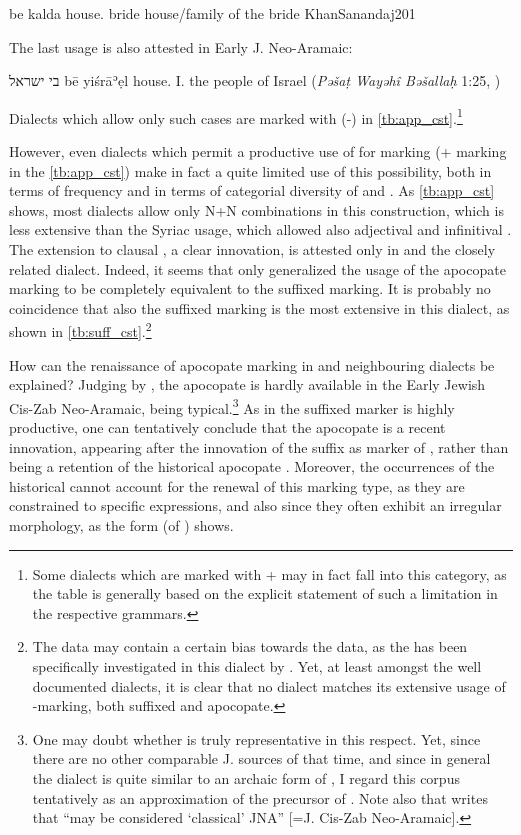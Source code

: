 {be\cb{} kalda}
{house.\cst\cb{} bride}
{house/family of the bride}
{KhanSanandaj}{201}\antipar

The last usage is also attested  in Early J. Neo-Aramaic:

{בי ישראל}
{bē yiśrāʾẹl}
{house.\cst{} I.}
{the people of Israel}
{(\textit{Pəšaṭ Wayəhî Bəšallaḥ} 1:25, \cite[38; see there  fn.\ 16]{SabarNerwa})}


Dialects which allow only such cases are marked with (-) in \ref{tb:app_cst}.\footnote{Some dialects which are marked with + may in fact fall into this category, as the table is generally based on the explicit statement of such a limitation in the respective grammars.}

However, even dialects which permit a productive use of  for marking \cst* \prims (+ marking in the \ref{tb:app_cst}) make in fact a quite limited use of this possibility, both in terms of frequency and in terms of categorial diversity of \prim and \secn. As  \ref{tb:app_cst} shows, most dialects allow only N+N combinations in this construction, which is less extensive than the Syriac usage, which allowed also adjectival and infinitival \prims. The extension to clausal \secns, a clear innovation, is attested only in \JZax and the closely related \Amd dialect. Indeed, it seems that only  \JZax generalized the usage of the apocopate \cst* marking to be completely equivalent to the suffixed \cst* marking. It is probably no coincidence that also the suffixed \cst* marking is the most extensive in this dialect, as shown in \vref{tb:suff_cst}.\footnote{The data may contain a certain bias towards the \JZax data, as the  has been specifically investigated in this dialect by \citet[Ch.\ 2]{CohenNucleus, CohenZakho}. Yet, at least amongst the well documented dialects, it is clear that no dialect matches its extensive usage  of  \cst*-marking, both suffixed and apocopate.}	


How can the renaissance of apocopate \cst* marking in \JZax and neighbouring dialects be explained? Judging by \Nrt, the apocopate \cst* is hardly available in the Early Jewish Cis-Zab Neo-Aramaic,  being typical.\footnote{One may doubt whether \Nrt is truly representative in this respect. Yet,  since there are no other comparable J.  sources of that time, and since in general the dialect is quite similar to an archaic form of \JZax, I regard  this corpus tentatively as an approximation of the precursor of \JZax. Note also that \citet{SabarDictionary} writes that \Nrt \enquote{may be considered \enquote{classical} JNA} [=J. Cis-Zab Neo-Aramaic].}  As in \Nrt the suffixed \cst* marker is highly productive, one can tentatively conclude that the apocopate \cst* is a recent innovation, appearing after the innovation of the \ed suffix as marker of \cst*, rather than being a retention of the historical apocopate \cst*. Moreover, the occurrences of the historical \cst* cannot account for the renewal of this marking type, as they are constrained to specific expressions, and also since they often exhibit an irregular morphology, as the form  (\cst* of ) shows. 

